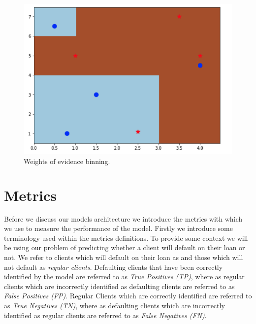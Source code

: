 \begin  {figure}[!htpb]
\centering
  \includegraphics[width=\linewidth]{Credit_Images/WOE_EXPLANATION.png}
   \caption{Weights of evidence binning.}
    \label{fig-woe-binning}
\end{figure}

 



\section{Metrics}
Before we discuss our models architecture we introduce the metrics with which we use to measure the performance of the model. Firstly we introduce some terminology used within the metrics definitions. To provide some context we will be using our problem of predicting whether a client will default on their loan or not. We refer to clients which will default on their loan as  and those which will not default as \emph{regular clients}. Defaulting clients that have been correctly identified by the model are referred to as \emph{True Positives (TP)}, where as regular clients which are incorrectly identified as defaulting clients are referred to as \emph{False Positives (FP)}. Regular Clients which are correctly identified are referred to as \emph{True Negatives (TN)}, where as defaulting clients which are incorrectly identified as regular clients are referred to as \emph{False Negatives (FN)}.
